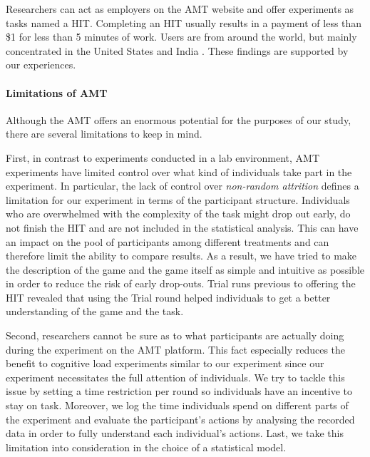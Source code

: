 Researchers can act as employers on the \ac{AMT} website and offer experiments as tasks named a \acf{HIT}. Completing an \ac{HIT} usually results in a payment of less than \$1 for less than 5 minutes of work. Users are from around the world, but mainly concentrated in the United States and India \citep{Rand2012}. These findings are supported by our experiences.

\paragraph{Limitations of \acl{AMT}}
Although the \ac{AMT} offers an enormous potential for the purposes of our study, there are several limitations to keep in mind.

First, in contrast to experiments conducted in a lab environment, \ac{AMT} experiments have limited control over what kind of individuals take part in the experiment. In particular, the lack of control over \textit{non-random attrition} \citep{Rand2012} defines a limitation for our experiment in terms of the participant structure. Individuals who are overwhelmed with the complexity of the task might drop out early, do not finish the \ac{HIT} and are not included in the statistical analysis. This can have an impact on the pool of participants among different treatments and can therefore limit the ability to compare results. As a result, we have tried to make the description of the game and the game itself as simple and intuitive as possible in order to reduce the risk of early drop-outs. Trial runs previous to offering the \ac{HIT} revealed that using the Trial round helped individuals to get a better understanding of the game and the task.

Second, researchers cannot be sure as to what participants are actually doing during the experiment on the \ac{AMT} platform. This fact especially reduces the benefit to cognitive load experiments similar to our experiment since our experiment necessitates the full attention of individuals. We try to tackle this issue by setting a time restriction per round so individuals have an incentive to stay on task. Moreover, we log the time individuals spend on different parts of the experiment and evaluate the participant's actions by analysing the recorded data in order to fully understand each individual's actions. Last, we take this limitation into consideration in the choice of a statistical model.

